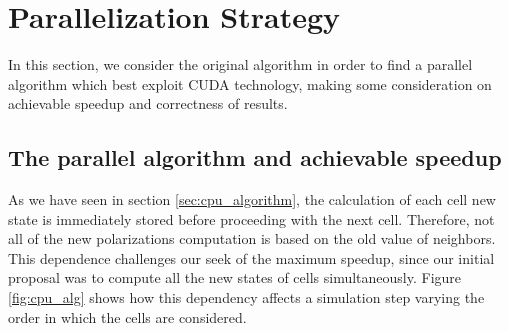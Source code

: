 \section{Parallelization Strategy}
In this section, we consider the original algorithm in order to find a parallel algorithm which best exploit CUDA technology, making some consideration on achievable speedup and correctness of results.
\subsection{The parallel algorithm and achievable speedup}\label{sec:new_algorithm}
As we have seen in section \ref{sec:cpu_algorithm}, the calculation of each cell new state is immediately stored before proceeding with the next cell. Therefore, not all of the new polarizations computation is based on the old value of neighbors. This dependence challenges our seek of the maximum speedup, since our initial proposal was to compute all the new states of cells simultaneously. Figure \ref{fig:cpu_alg} shows how this dependency affects a simulation step varying the order in which the cells are considered.
